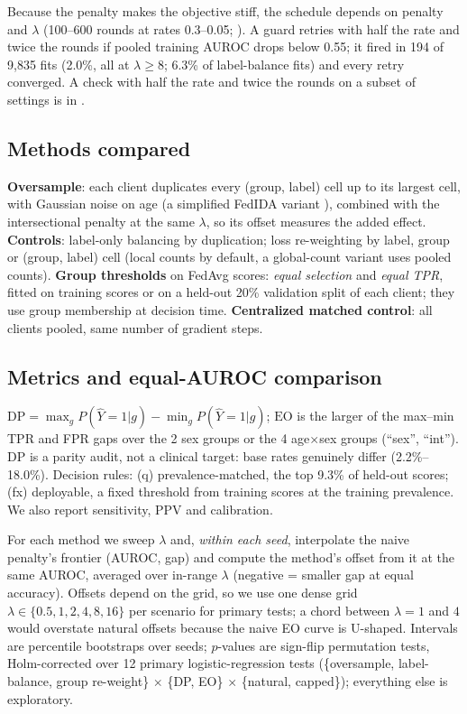 \documentclass[conference]{IEEEtran}
\newcommand{\DP}{\mathrm{DP}}
\newcommand{\EO}{\mathrm{EO}}
\begin{document}
Because the penalty makes the objective stiff, the schedule depends on penalty and $\lambda$ (100--600 rounds at rates 0.3--0.05; ). A guard retries with half the rate and twice the rounds if pooled training AUROC drops below 0.55; it fired in 194 of 9,835 fits (2.0\%, all at $\lambda\ge8$; 6.3\% of label-balance fits) and every retry converged. A check with half the rate and twice the rounds on a subset of settings is in .

\subsection{Methods compared}
\textbf{Oversample}: each client duplicates every (group, label) cell up to its largest cell, with Gaussian noise on age (a simplified FedIDA variant \cite{wu2025fedida}), combined with the intersectional penalty at the same $\lambda$, so its offset measures the added effect. \textbf{Controls}: label-only balancing by duplication; loss re-weighting by label, group or (group, label) cell (local counts by default, a global-count variant uses pooled counts). \textbf{Group thresholds} \cite{hardt2016} on FedAvg scores: \emph{equal selection} and \emph{equal TPR}, fitted on training scores or on a held-out 20\% validation split of each client; they use group membership at decision time. \textbf{Centralized matched control}: all clients pooled, same number of gradient steps.

\subsection{Metrics and equal-AUROC comparison}
\label{sec:eval}
$\DP=\max_g P(\hat Y{=}1|g)-\min_g P(\hat Y{=}1|g)$; $\EO$ is the larger of the max--min TPR and FPR gaps over the 2 sex groups or the 4 age$\times$sex groups (``sex'', ``int''). DP is a parity audit, not a clinical target: base rates genuinely differ (2.2\%--18.0\%). Decision rules: (q) prevalence-matched, the top 9.3\% of held-out scores; (fx) deployable, a fixed threshold from training scores at the training prevalence. We also report sensitivity, PPV and calibration.

For each method we sweep $\lambda$ and, \emph{within each seed}, interpolate the naive penalty's frontier (AUROC, gap) and compute the method's offset from it at the same AUROC, averaged over in-range $\lambda$ (negative = smaller gap at equal accuracy). Offsets depend on the grid, so we use one dense grid $\lambda\in\{0.5,1,2,4,8,16\}$ per scenario for primary tests; a chord between $\lambda{=}1$ and $4$ would overstate natural offsets because the naive EO curve is U-shaped. Intervals are percentile bootstraps over seeds; $p$-values are sign-flip permutation tests, Holm-corrected over 12 primary logistic-regression tests (\{oversample, label-balance, group re-weight\} $\times$ \{DP, EO\} $\times$ \{natural, capped\}); everything else is exploratory.
\end{document}
